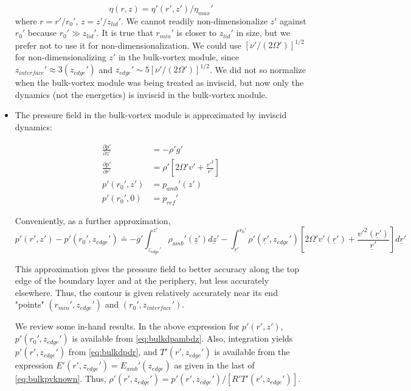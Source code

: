\documentclass[preprint, prX]{revtex4}
\newcommand{\pd}[2]{\frac{\partial#1}{\partial#2}}
\newcommand{\rmin}{r_{min}}
\newcommand{\zedge}{z_{edge}}
\newcommand{\zinter}{z_{interface}}
\begin{document}
\begin{itemize}
\begin{equation}
	\eta(r,z) = \eta'(r',z')/\eta_{max}'
\end{equation}
where $r = r'/r_0'$, $z=z'/z_{lid}'$. We cannot readily non-dimensionalize $z'$ against $r_0'$ because $r_0' \gg z_{lid}'$. It is true that $\rmin'$ is closer to $z_{lid}'$ in size, but we prefer not to use it for non-dimensionalization. We could use $[\nu'/(2\Omega')]^{1/2}$ for non-dimensionalizing $z'$ in the bulk-vortex module, since $\zinter' \approx 3(\zedge')$ and $\zedge' \sim 5 [ \nu' /(2\Omega')]^{1/2}$. We did not so normalize when the bulk-vortex module was being treated as inviscid, but now only the dynamics (not the energetics) is inviscid in the bulk-vortex module.

\item The pressure field in the bulk-vortex module is approximated by inviscid dynamics:

\begin{equation}
\begin{split}
	\pd{ p'}{ z'} &= -\rho' g' \\
	\pd{ p'}{ r'} & = \rho'\left[ 2\Omega' v' + \frac{v'^2}{r'} \right ]\\
	p'(r_0',z') &= p_{amb}'(z') \\
	p'(r_0',0) &= p_{ref}'
\end{split}
\end{equation}

Conveniently, as a further approximation,
\begin{equation}
	p'(r',z') - p'(r_0', \zedge') \doteq -g' \int_{\zedge'}^{z'} \rho_{amb}'(\underline{z}') d\underline{z}' - \int_{r'}^{r_0'} \rho'(\underline{r}', \zedge') \left[ 2\Omega'v'(\underline{r}') + \frac{v'^2(\underline{r}')}{\underline{r}'}\right] d\underline{r}'
\end{equation}

This approximation gives the pressure field to better accuracy along the top edge of the boundary layer and at the periphery, but less accurately elsewhere. Thus, the contour is given relatively accurately near its end "points" $(\rmin', \zedge')$ and $(r_0', \zinter')$.

We review some in-hand results. In the above expression for $p'(r',z')$, $p'(r_0', \zedge')$ is available from \eqref{eq:bulkdpambdz}. Also, integration yields $p'(r',\zedge')$ from \eqref{eq:bulkdpdr}, and $T'(r',\zedge')$ is available from the expression $E'(r',\zedge') = E_{amb}'(\zedge)$ as given in the last of \eqref{eq:bulkpvknown}. Thus, $\rho'(r',\zedge') = p'(r',\zedge')/[R' T'(r',\zedge')]$.


\end{itemize}
\end{document}
